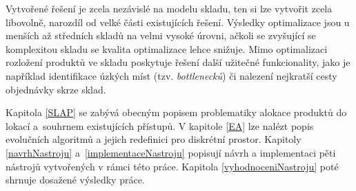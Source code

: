 Vytvořené řešení je zcela nezávislé na modelu skladu, ten si lze vytvořit zcela libovolně, narozdíl od velké části existujících řešení. Výsledky optimalizace jsou u menších až středních skladů na velmi vysoké úrovni, ačkoli se zvyšující se komplexitou skladu se kvalita optimalizace lehce snižuje. Mimo optimalizaci rozložení produktů ve skladu poskytuje řešení další užitečné funkcionality, jako je například identifikace úzkých míst (tzv. \emph{bottlenecků}) či nalezení nejkratší cesty objednávky skrze sklad.

Kapitola \ref{SLAP} se zabývá obecným popisem problematiky alokace produktů do lokací a~souhrnem existujících přístupů. V kapitole \ref{EA} lze nalézt popis evolučních algoritmů a jejich redefinici pro diskrétní prostor. Kapitoly \ref{navrhNastroju} a~\ref{implementaceNastroju} popisují návrh a implementaci pěti nástrojů vytvořených v rámci této práce. Kapitola \ref{vyhodnoceniNastroju} poté shrnuje dosažené výsledky práce.
